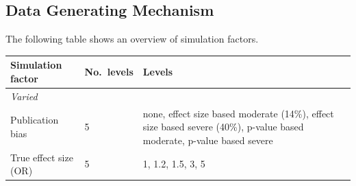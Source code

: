 \documentclass[
  english,
  doc,floatsintext,draftall]{apa6}
\begin{document}
\hypertarget{data-generating-mechanism}{%
\subsection{Data Generating Mechanism}\label{data-generating-mechanism}}

The following table shows an overview of simulation factors.

\begin{longtable}[]{@{}lll@{}}
\toprule
\begin{minipage}[b]{0.37\columnwidth}\raggedright
Simulation factor\strut
\end{minipage} & \begin{minipage}[b]{0.12\columnwidth}\raggedright
No.~levels\strut
\end{minipage} & \begin{minipage}[b]{0.43\columnwidth}\raggedright
Levels\strut
\end{minipage}\tabularnewline
\midrule
\endhead
\begin{minipage}[t]{0.37\columnwidth}\raggedright
\emph{Varied}\strut
\end{minipage} & \begin{minipage}[t]{0.12\columnwidth}\raggedright
\strut
\end{minipage} & \begin{minipage}[t]{0.43\columnwidth}\raggedright
\strut
\end{minipage}\tabularnewline
\begin{minipage}[t]{0.37\columnwidth}\raggedright
Publication bias\strut
\end{minipage} & \begin{minipage}[t]{0.12\columnwidth}\raggedright
5\strut
\end{minipage} & \begin{minipage}[t]{0.43\columnwidth}\raggedright
none, effect size based moderate (14\%), effect size based severe (40\%), p-value based moderate, p-value based severe\strut
\end{minipage}\tabularnewline
\begin{minipage}[t]{0.37\columnwidth}\raggedright
True effect size (OR)\strut
\end{minipage} & \begin{minipage}[t]{0.12\columnwidth}\raggedright
5\strut
\end{minipage} & \begin{minipage}[t]{0.43\columnwidth}\raggedright
1, 1.2, 1.5, 3, 5\strut
\end{minipage}\tabularnewline

\end{longtable}
\end{document}
